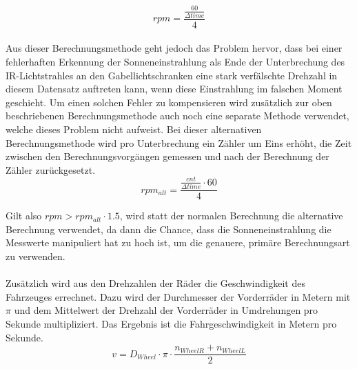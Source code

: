 \begin{equation}
rpm=\frac{\frac{60}{\Delta time}}{4}
\label{eqn:rpm}
\end{equation}
\\
Aus dieser Berechnungsmethode geht jedoch das Problem hervor, dass bei einer fehlerhaften Erkennung der Sonneneinstrahlung als Ende der Unterbrechung des \ac{IR}-Lichtstrahles an den Gabellichtschranken eine stark verfälschte Drehzahl in diesem Datensatz auftreten kann, wenn diese Einstrahlung im falschen Moment geschieht. Um einen solchen Fehler zu kompensieren wird zusätzlich zur oben beschriebenen Berechnungsmethode auch noch eine separate Methode verwendet, welche dieses Problem nicht aufweist. Bei dieser alternativen Berechnungsmethode wird pro Unterbrechung ein Zähler um Eins erhöht, die Zeit zwischen den Berechnungsvorgängen gemessen und nach der Berechnung der Zähler zurückgesetzt.
\begin{equation}
rpm_{alt}=\frac{\frac{cnt}{\Delta time}\cdot 60}{4}
\label{eqn:altrpm}
\end{equation}

Gilt also $rpm > rpm_{alt} \cdot 1.5$, wird statt der normalen Berechnung die alternative Berechnung verwendet, da dann die Chance, dass die Sonneneinstrahlung die Messwerte manipuliert hat zu hoch ist, um die genauere, primäre Berechnungsart zu verwenden.\\\\
Zusätzlich wird aus den Drehzahlen der Räder die Geschwindigkeit des Fahrzeuges errechnet. Dazu wird der Durchmesser der Vorderräder in Metern mit $\pi$ und dem Mittelwert der Drehzahl der Vorderräder in Umdrehungen pro Sekunde multipliziert. Das Ergebnis ist die Fahrgeschwindigkeit in Metern pro Sekunde.
\begin{equation}
v=D_{Wheel}\cdot\pi\cdot\frac{n_{WheelR}+n_{WheelL}}{2}
\label{eqn:velocity}
\end{equation}


